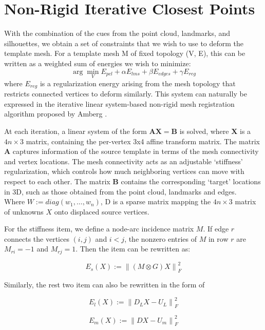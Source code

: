  \section{Non-Rigid Iterative Closest Points}
 With the combination of the cues from the point cloud, landmarks, and silhouettes, we obtain a set of constraints that we wish to use to deform the template mesh. For a template mesh M of fixed topology (V, E), this can be written as a weighted sum of energies we wish to minimize: 
 $$ \arg \min_{V}  E_{pcl} + \alpha E_{lms} + \beta E_{edges} +  \gamma E_{reg} $$
where $E_{reg}$ is a regularization energy arising from the mesh topology that restricts connected vertices to deform similarly. This system can naturally be expressed in the iterative linear system-based non-rigid mesh registration algorithm proposed by Amberg \etal \cite{amberg2007optimal}. 
 
 At each iteration, a linear system of the form $\mathbf{A}\mathbf{X} = \mathbf{B}$ is solved, where $\mathbf{X}$ is a $4n\times3$ matrix, containing the per-vertex 3x4 affine transform matrix. The matrix $\mathbf{A}$ captures information of the source template in terms of the mesh connectivity and vertex locations. The mesh connectivity acts as an adjustable `stiffness' regularization, which controls how much neighboring vertices can move with respect to each other. The matrix $\mathbf{B}$ contains the corresponding `target' locations in 3D, such as those obtained from the point cloud, landmarks and edges.\\
 
 Where $W := diag(w_1, \dots, w_n)$, D is a sparse matrix mapping the
$4n\times3$ matrix of unknowns $X$ onto displaced source vertices.

For the stiffness item, we define a node-arc incidence matrix $M$. If
edge $r$ connects the vertices $(i, j)$ and $i<j$, the nonzero entries
of $M$ in row $r$ are $M_{ri} = −1$ and $M_{rj} = 1$. Then the item
can be rewritten as:

\begin{equation}
  E_s(X) := {\| (M \otimes G)X \|}_F^2
\end{equation}

Similarly, the rest two item can also be rewritten in the form of

\begin{equation}
  E_l(X) := {\| D_LX - U_L \|}_F^2
\end{equation}

\begin{equation}
  E_m(X) := {\| DX - U_m \|}_F^2
\end{equation}

